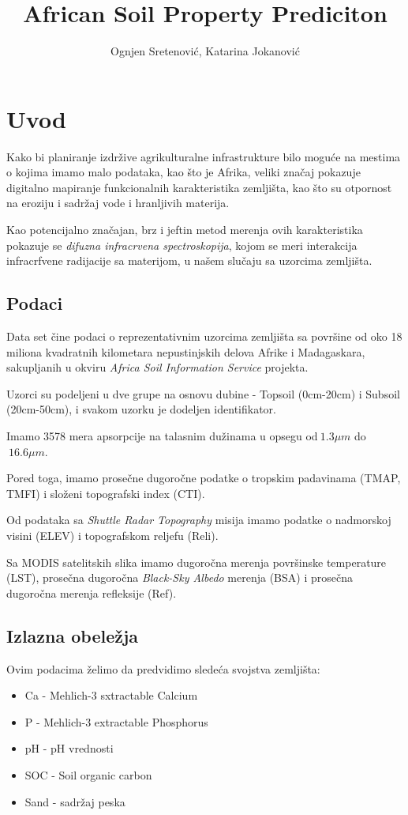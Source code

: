 \documentclass[12pt]{article}
\title{African Soil Property Prediciton}
\author{Ognjen Sretenović, Katarina Jokanović}
\begin{document}
\maketitle

\twocolumn

\section{Uvod}
Kako bi planiranje izdržive agrikulturalne infrastrukture bilo moguće na mestima o kojima imamo malo podataka, kao što je Afrika, veliki značaj pokazuje digitalno mapiranje funkcionalnih karakteristika zemljišta, kao što su otpornost na eroziju i sadržaj vode i hranljivih materija.

Kao potencijalno značajan, brz i jeftin metod merenja ovih karakteristika pokazuje se \textit{difuzna infracrvena spectroskopija}, kojom se meri interakcija infracrfvene radijacije sa materijom, u našem slučaju sa uzorcima zemljišta.

\subsection{Podaci}
Data set čine podaci o reprezentativnim uzorcima zemljišta sa površine od oko 18 miliona kvadratnih kilometara nepustinjskih delova Afrike i Madagaskara, sakupljanih u okviru \textit{Africa Soil Information Service} projekta.

Uzorci su podeljeni u dve grupe na osnovu dubine - Topsoil (0cm-20cm) i Subsoil (20cm-50cm), i svakom uzorku je dodeljen identifikator.

Imamo 3578 mera apsorpcije na talasnim dužinama u opsegu od$~1.3\mu m$ do$~16.6 \mu m$.

Pored toga, imamo prosečne dugoročne podatke o tropskim padavinama (TMAP, TMFI) i složeni topografski index (CTI).

Od podataka sa \textit{Shuttle Radar Topography} misija imamo podatke o nadmorskoj visini (ELEV) i topografskom reljefu (Reli).

Sa MODIS satelitskih slika imamo dugoročna merenja površinske temperature (LST), prosečna dugoročna \textit{Black-Sky Albedo} merenja (BSA) i prosečna dugoročna merenja refleksije (Ref). 

\subsection{Izlazna obeležja}
Ovim podacima želimo da predvidimo sledeća svojstva zemljišta:
\begin{itemize}
	\item Ca - Mehlich-3 sxtractable Calcium
	\item P - Mehlich-3 extractable Phosphorus
	\item pH - pH vrednosti
	\item SOC - Soil organic carbon
	\item Sand - sadržaj peska
\end{itemize}
\end{document}
